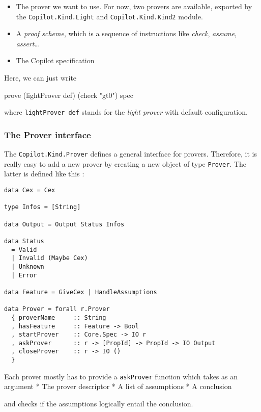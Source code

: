 \begin{itemize}
\itemsep1pt\parskip0pt
\item
  The prover we want to use. For now, two provers are available,
  exported by the \texttt{Copilot.Kind.Light} and
  \texttt{Copilot.Kind.Kind2} module.
\item
  A \emph{proof scheme}, which is a sequence of instructions like
  \emph{check}, \emph{assume}, \emph{assert}\ldots{}
\item
  The Copilot specification
\end{itemize}

Here, we can just write
\begin{code}
prove (lightProver def) (check "gt0") spec
\end{code}

where \texttt{lightProver def} stands for the \emph{light prover} with
default configuration.

\subsubsection{The Prover interface}\label{the-prover-interface}

The \texttt{Copilot.Kind.Prover} defines a general interface for
provers. Therefore, it is really easy to add a new prover by creating a
new object of type \texttt{Prover}. The latter is defined like this :

\begin{lstlisting}[frame=single]
data Cex = Cex

type Infos = [String]

data Output = Output Status Infos

data Status
  = Valid
  | Invalid (Maybe Cex)
  | Unknown
  | Error
  
data Feature = GiveCex | HandleAssumptions
  
data Prover = forall r.Prover 
  { proverName     :: String
  , hasFeature     :: Feature -> Bool
  , startProver    :: Core.Spec -> IO r
  , askProver      :: r -> [PropId] -> PropId -> IO Output 
  , closeProver    :: r -> IO () 
  }

\end{lstlisting}

Each prover mostly has to provide a \texttt{askProver} function which
takes as an argument * The prover descriptor * A list of assumptions * A
conclusion

and checks if the assumptions logically entail the conclusion.

